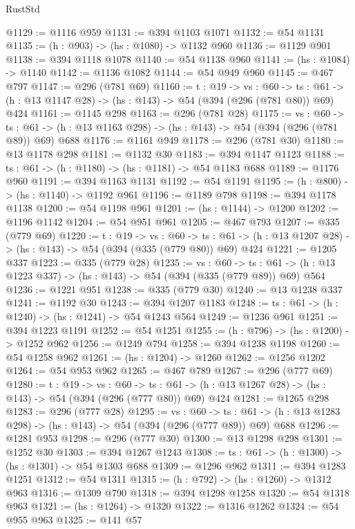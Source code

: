 \begin{lexlean}{RustStd}
\begin{coremodule}
{\begin{coremodule}
{{{{{{{{@1129 := @1116 @959
@1131 := @394 @1103 @1071
@1132 := @54 @1131
@1135 := (h : @903) -> (hs : @1080) -> @1132 @960
@1136 := @1129 @901
@1138 := @394 @1118 @1078
@1140 := @54 @1138 @960
@1141 := (hs : @1084) -> @1140
@1142 := @1136 @1082
@1144 := @54 @949 @960
@1145 := @467 @797
@1147 := @296 (@781 @69)
@1160 := {t : @19} ->
  {vs : @60} ->
  {ts : @61} -> (h : @13 @1147 @28) -> (hs : @143) -> @54 (@394 (@296 (@781 @80)) @69) @424
@1161 := @1145 @298
@1163 := @296 (@781 @28)
@1175 := {vs : @60} ->
  {ts : @61} -> (h : @13 @1163 @298) -> (hs : @143) -> @54 (@394 (@296 (@781 @89)) @69) @688
@1176 := @1161 @949
@1178 := @296 (@781 @30)
@1180 := @13 @1178 @298
@1181 := @1132 @30
@1183 := @394 @1147 @1123
@1188 := {ts : @61} -> (h : @1180) -> (hs : @1181) -> @54 @1183 @688
@1189 := @1176 @960
@1191 := @394 @1163 @1131
@1192 := @54 @1191
@1195 := (h : @800) -> (hs : @1140) -> @1192 @961
@1196 := @1189 @798
@1198 := @394 @1178 @1138
@1200 := @54 @1198 @961
@1201 := (hs : @1144) -> @1200
@1202 := @1196 @1142
@1204 := @54 @951 @961
@1205 := @467 @793
@1207 := @335 (@779 @69)
@1220 := {t : @19} ->
  {vs : @60} ->
  {ts : @61} -> (h : @13 @1207 @28) -> (hs : @143) -> @54 (@394 (@335 (@779 @80)) @69) @424
@1221 := @1205 @337
@1223 := @335 (@779 @28)
@1235 := {vs : @60} ->
  {ts : @61} -> (h : @13 @1223 @337) -> (hs : @143) -> @54 (@394 (@335 (@779 @89)) @69) @564
@1236 := @1221 @951
@1238 := @335 (@779 @30)
@1240 := @13 @1238 @337
@1241 := @1192 @30
@1243 := @394 @1207 @1183
@1248 := {ts : @61} -> (h : @1240) -> (hs : @1241) -> @54 @1243 @564
@1249 := @1236 @961
@1251 := @394 @1223 @1191
@1252 := @54 @1251
@1255 := (h : @796) -> (hs : @1200) -> @1252 @962
@1256 := @1249 @794
@1258 := @394 @1238 @1198
@1260 := @54 @1258 @962
@1261 := (hs : @1204) -> @1260
@1262 := @1256 @1202
@1264 := @54 @953 @962
@1265 := @467 @789
@1267 := @296 (@777 @69)
@1280 := {t : @19} ->
  {vs : @60} ->
  {ts : @61} -> (h : @13 @1267 @28) -> (hs : @143) -> @54 (@394 (@296 (@777 @80)) @69) @424
@1281 := @1265 @298
@1283 := @296 (@777 @28)
@1295 := {vs : @60} ->
  {ts : @61} -> (h : @13 @1283 @298) -> (hs : @143) -> @54 (@394 (@296 (@777 @89)) @69) @688
@1296 := @1281 @953
@1298 := @296 (@777 @30)
@1300 := @13 @1298 @298
@1301 := @1252 @30
@1303 := @394 @1267 @1243
@1308 := {ts : @61} -> (h : @1300) -> (hs : @1301) -> @54 @1303 @688
@1309 := @1296 @962
@1311 := @394 @1283 @1251
@1312 := @54 @1311
@1315 := (h : @792) -> (hs : @1260) -> @1312 @963
@1316 := @1309 @790
@1318 := @394 @1298 @1258
@1320 := @54 @1318 @963
@1321 := (hs : @1264) -> @1320
@1322 := @1316 @1262
@1324 := @54 @955 @963
@1325 := @141 @57
}}}}}}}}
\end{coremodule}}
\end{coremodule}
\end{lexlean}
